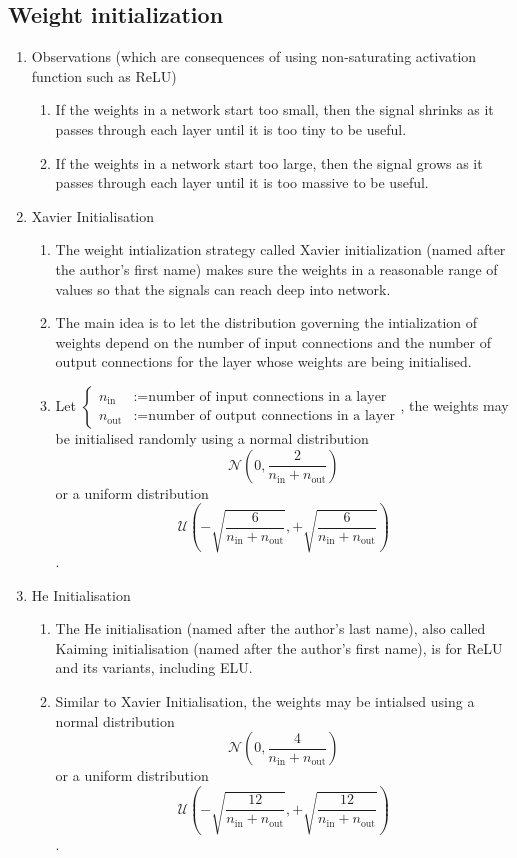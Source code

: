 \documentclass[11pt]{article}
\begin{document}
\subsection{Weight initialization}
\begin{enumerate}
    \item Observations (which are consequences of using non-saturating activation function such as ReLU)
        \begin{enumerate}
            \item If the weights in a network start too small, then the signal shrinks as it passes through each layer until it is too tiny to be useful. 
            \item If the weights in a network start too large, then the signal grows as it passes through each layer until it is too massive to be useful. 
        \end{enumerate}
    \item Xavier Initialisation 
    \begin{enumerate}
        \item The weight intialization strategy called Xavier initialization (named after the author's first name) makes sure the weights in a reasonable range of values so that the signals can reach deep into network. 
        \item The main idea is to let the distribution governing the intialization of weights depend on the number of input connections and the number of output connections for the layer whose weights are being initialised. 
        \item Let $\begin{cases}n_{\text{in}} &:= \text{number of input connections in a layer}\\
        n_{\text{out}} &:= \text{number of output connections in a layer} \end{cases} $, the weights may be initialised randomly using a normal distribution $$\mathcal{N}(0, \dfrac{2}{n_{\text{in}} + n_{\text{out}}})$$ or a uniform distribution $$\mathcal{U}(- \sqrt{\dfrac{6}{n_{\text{in}} + n_{\text{out}}}}, +\sqrt{\dfrac{6}{n_{\text{in}} + n_{\text{out}}}})$$.
    \end{enumerate}
    \item He Initialisation
    \begin{enumerate}
        \item The He initialisation (named after the author's last name), also called Kaiming initialisation (named after the author's first name), is for ReLU and its variants, including ELU.
        \item Similar to Xavier Initialisation, the weights may be intialsed using a normal distribution $$\mathcal{N}(0, \dfrac{4}{n_{\text{in}} + n_{\text{out}}})$$ or a uniform distribution $$\mathcal{U}(- \sqrt{\dfrac{12}{n_{\text{in}} + n_{\text{out}}}}, +\sqrt{\dfrac{12}{n_{\text{in}} + n_{\text{out}}}})$$.
    \end{enumerate}
\end{enumerate}
\end{document}
